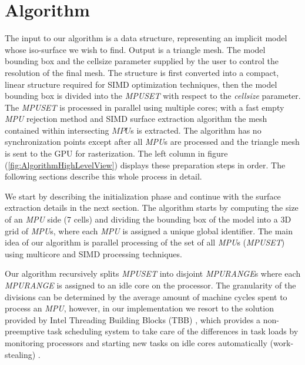 \section{Algorithm}\label{sec:algorithm}
The input to our algorithm is a \blob data structure, representing an implicit model whose iso-surface we wish to find. Output is a 
triangle mesh.  The model bounding box and the cellsize parameter supplied by the user to control the resolution of the final mesh.
The \blob structure is first converted into a compact, linear structure required for SIMD optimization techniques, then the model 
bounding box is divided into the \textit{MPUSET} with respect to the \textit{cellsize} parameter.
The \textit{MPUSET} is processed in parallel using multiple cores; with a fast empty \textit{MPU} rejection method and SIMD surface 
extraction algorithm the mesh contained within intersecting $MPU$s is extracted. The algorithm has no synchronization points except after 
all \textit{MPU}s are processed and the triangle mesh is sent to the GPU for rasterization. The left column in figure 
(\ref{fig:AlgorithmHighLevelView}) displays these preparation steps in order.
The following sections describe this whole process in detail.


We start by describing the initialization phase and continue with the surface extraction details in the next section.
The algorithm starts by computing the size of an \textit{MPU} side (7 cells) and dividing the bounding box of the model into a 
3D grid of \textit{MPU}s, where each \textit{MPU} is assigned a unique global identifier. The main idea of our algorithm is parallel 
processing of the set of all \textit{MPU}s (\textit{MPUSET}) using multicore and SIMD processing techniques.

Our algorithm recursively splits \textit{MPUSET} into disjoint \textit{MPURANGE}s where each \textit{MPURANGE} is assigned to an idle core on 
the processor. The granularity of the divisions can be determined by the average amount of machine cycles spent to process an \textit{MPU}, 
however, in our implementation we resort to the solution provided by Intel Threading Building Blocks (TBB) \cite{Reinders2007}, 
which provides a non-preemptive task scheduling system to take care of the differences in task loads by 
monitoring processors and starting new tasks on idle cores automatically (work-stealing) \cite{Reinders2007}.


